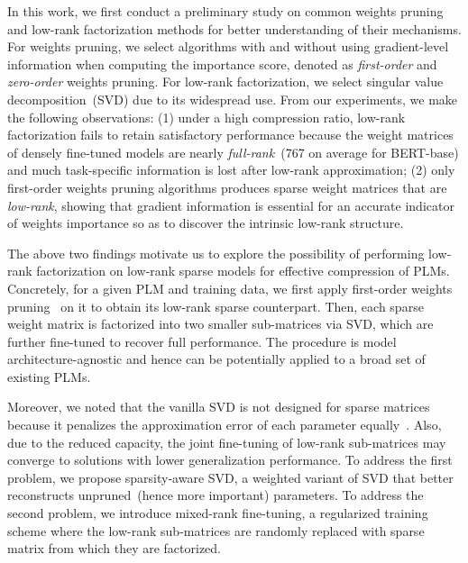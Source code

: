In this work, we first conduct a preliminary study on common weights pruning and low-rank 
factorization methods for better understanding of their mechanisms. 
For weights pruning, we select algorithms with and without using gradient-level information when computing the importance score, denoted as \textit{first-order} and \textit{zero-order} weights pruning. For low-rank factorization, we select singular value decomposition~(SVD) due to its widespread use. From our experiments, we make the following observations: (1) under a high compression ratio, low-rank factorization fails to retain satisfactory performance because the weight matrices of densely fine-tuned models are nearly \textit{full-rank}~(767 on average for BERT-base) and much task-specific information is lost after low-rank approximation; (2) only first-order weights pruning algorithms produces sparse weight matrices that are \textit{low-rank}, showing that gradient information is essential for an accurate indicator of weights importance so as to discover the intrinsic low-rank structure.

The above two findings motivate us to explore the possibility of performing low-rank factorization on low-rank sparse models for effective compression of PLMs. Concretely, for a given PLM and training data, we first apply first-order weights pruning~\cite{movement} on it to obtain its low-rank sparse counterpart. Then, each sparse weight matrix is factorized into two smaller sub-matrices via SVD, which are further fine-tuned to recover full performance. The procedure is 
model architecture-agnostic and hence can be potentially applied to a broad set of existing PLMs. 

Moreover, we noted that the vanilla SVD is not designed for 
sparse matrices because it penalizes the approximation error of 
each parameter equally~\cite{group}. Also, due to the reduced capacity, 
the joint fine-tuning of low-rank sub-matrices may converge to 
solutions with lower generalization performance. To address the first problem, 
we propose sparsity-aware SVD, a weighted variant of SVD that 
better reconstructs unpruned~(hence more important) parameters. 
To address the second problem, we introduce mixed-rank fine-tuning, 
a regularized training scheme where the low-rank sub-matrices 
are randomly replaced with sparse matrix from which they are factorized. 


